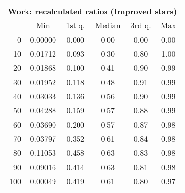 \begin{tabular}{r|ccccc}
  \multicolumn{6}{c}{{\bf Work: recalculated ratios (Improved stars)}} \\
  & Min & 1st q. & Median & 3rd q. & Max \\ \hline\hline
  0 & 0.00000 & 0.000 & 0.00 & 0.00 & 0.00
\\ 10 & 0.01712 & 0.093 & 0.30 & 0.80 & 1.00
\\ 20 & 0.01868 & 0.100 & 0.41 & 0.90 & 0.99
\\ 30 & 0.01952 & 0.118 & 0.48 & 0.91 & 0.99
\\ 40 & 0.03033 & 0.136 & 0.56 & 0.90 & 0.99
\\ 50 & 0.04288 & 0.159 & 0.57 & 0.88 & 0.99
\\ 60 & 0.03690 & 0.200 & 0.57 & 0.87 & 0.98
\\ 70 & 0.03797 & 0.352 & 0.61 & 0.84 & 0.98
\\ 80 & 0.11053 & 0.458 & 0.63 & 0.83 & 0.98
\\ 90 & 0.09016 & 0.414 & 0.63 & 0.81 & 0.98
\\ 100 & 0.00049 & 0.419 & 0.61 & 0.80 & 0.97
\end{tabular}
